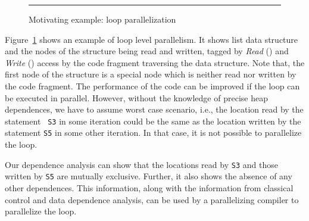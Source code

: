\begin{figure}[t]
  \begin{center}
  
  \end{center}
  \hrule
  \caption{\label{fig:motiv} Motivating example: loop parallelization}
\end{figure}
\begin{example}{\rm
  Figure~\ref{fig:motiv}
  shows an example of loop level parallelism. It shows list data structure and the nodes of the structure being read and written, tagged by \emph{Read} () 
  and \emph{Write} () access by the code fragment traversing the
  data structure. Note that, the first node of the structure is a special node which is neither 
  read nor written by the code fragment. The performance of the code can be improved if the loop can
  be executed in parallel. However, without the knowledge of
  precise heap dependences, we have to assume worst case
  scenario, i.e.,  the  location read by the statement {\tt
    S3} in some iteration could be the same as the location
  written by the statement {\tt S5} in some other iteration.
  In that case,  it is not possible to parallelize the loop.
 
  Our dependence analysis can show that the locations read by
  {\tt S3} and those written by {\tt S5} are mutually
  exclusive. Further, it also shows the absence of any other
  dependences.  This information, along with the information
  from classical control and data dependence analysis, can be
  used by a parallelizing compiler to parallelize the loop.
}
\hfill\psframebox{}  
\end{example}

